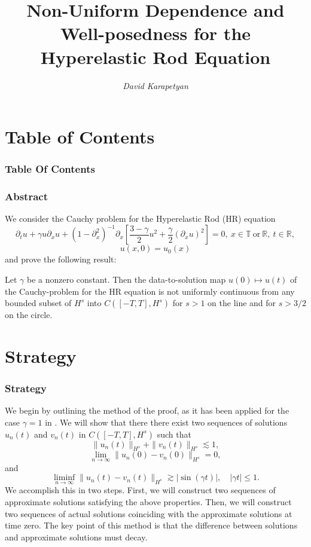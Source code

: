 \documentclass{beamer}
\date{}
\title{Non-Uniform Dependence and Well-posedness for the Hyperelastic Rod Equation}
\author{\it David Karapetyan}
\newcommand{\rr}{\mathbb{R}}
\newcommand{\p}{\partial}
\begin{document}
 \begin{frame}
	 \titlepage
 \end{frame}

\section*{Table of Contents}
\begin{frame}
	\frametitle{Table Of Contents}
	\tableofcontents
\end{frame}


 \begin{frame}
	 \frametitle{Abstract}
	 We consider the Cauchy problem for the Hyperelastic Rod (HR) equation
	 \begin{equation*} 
		 \label{hr}
		 \partial_t u + \gamma u\partial_x u + (1-\p_x^2)^{-1} \p_x \left
		 [\frac{3- \gamma}{2} u^2 + \frac{\gamma}{2}(\p_x u)^2 \right ] = 0,
		 \ x \in  \mathbb{T} \  \text{or}  \ \rr,  \ t \in \mathbb{R},
	 \end{equation*}
	 \begin{equation*} 
		 \label{hr-data} 
		 u(x, 0) = u_0 (x)
	 \end{equation*}
%
and prove the following result:
%
%
\pause
%
\begin{theorem}
\label{hr-non-unif-dependence}
Let $\gamma$ be a nonzero constant. Then 
the data-to-solution map $u(0) \mapsto u(t)$ of the Cauchy-problem
for the HR equation is not uniformly continuous
from any bounded subset of  $H^s$ into $C([-T, T], H^s)$
for $s>1$ on the line  and for $s>3/2$ on the circle.
%
\end{theorem}
\end{frame}
%
%
\section{Strategy}
\begin{frame}
	\frametitle{Strategy}
We begin by outlining the method of the proof,
as it has been applied for the case $\gamma=1$ in \cite{Himonas_2009_Non-uniform-dep}.
We will show that there there exist two sequences of solutions 
$u_n(t)$
and $v_n(t)$ in $C([-T, T], H^s)$ such that
\pause
%
%
%
%
\begin{equation*}
\label{h-s-bdd}
\| u_n(t)  \|_{H^s}
+
\| v_n(t)  \|_{H^s}
\lesssim
1,
\end{equation*}
%
%
%
%
%
\begin{equation*}
\label{zero-limit-at-0}
\lim_{n\to\infty}
\|
u_n(0)
-
v_n(0)
\|_{H^s}
=
0,
\end{equation*}
%
%
%
%
and
%
%
%
%
\begin{equation*}
\label{bdd-away-from-0}
\liminf_{n\to\infty}
\|
u_n(t)
-
v_n(t)
\|_{H^s}
\gtrsim
|\sin ( \gamma t)|,
\quad
| \gamma t|\le 1.
\end{equation*}%
%
%
\pause
We accomplish this in two steps.
First, we will construct two sequences of approximate solutions
satisfying the above properties.
Then, we will construct two sequences of actual solutions 
coinciding with the approximate solutions at time zero.
The key point of this method is that 
the difference between solutions and approximate solutions
must decay.
\end{frame}
%
%
\end{document}
